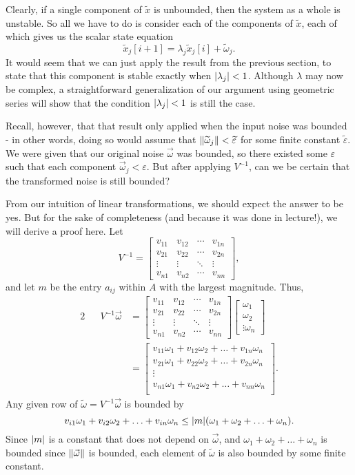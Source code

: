 \documentclass[letterpaper]{article}
\theoremstyle{remark}
\newcommand{\eps}{{\varepsilon}}    %
\renewcommand{\tilde}[1]{\widetilde{#1}}
\newcommand{\mat}[1]{\ensuremath{\begin{bmatrix}#1\end{bmatrix}}}
\newcommand{\eqn}[1]{\begin{alignat*}{2}#1\end{alignat*}}
\begin{document}
Clearly, if a single component of $\tilde{x}$ is unbounded, then the system as a whole is unstable. So all we have to do is consider each of the components of $\tilde{x}$, each of which gives us the scalar state equation
\[
    \tilde{x}_j[i + 1] = \lambda_j \tilde{x}_j[i] + \tilde{\omega}_j.
\]
It would seem that we can just apply the result from the previous section, to state that this component is stable exactly when $\abs{\lambda_j} < 1$. Although $\lambda$ may now be complex, a straightforward generalization of our argument using geometric series will show that the condition $\abs{\lambda_j} < 1$ is still the case.

Recall, however, that that result only applied when the input noise was bounded - in other words, doing so would assume that $\norm{\tilde{\omega}_j} < \tilde{\eps}$ for some finite constant $\tilde{\eps}$. We were given that our original noise $\vec{\omega}$ was bounded, so there existed some $\eps$ such that each component $\vec{\omega}_j < \eps$. But after applying $V^{-1}$, can we be certain that the transformed noise is still bounded? 

From our intuition of linear transformations, we should expect the answer to be yes. But for the sake of completeness (and because it was done in lecture!), we will derive a proof here. Let
\[
    V^{-1} = \mat{
    v_{11} & v_{12} & \cdots & v_{1n} \\
    v_{21} & v_{22} & \cdots & v_{2n} \\
    \vdots & \vdots & \ddots & \vdots \\
    v_{n1} & v_{n2} & \cdots & v_{nn}
    },
\]
and let $m$ be the entry $a_{ij}$ within $A$ with the largest magnitude. Thus,
\eqn{
    && V^{-1}\vec{\omega} &= \mat{
    v_{11} & v_{12} & \cdots & v_{1n} \\
    v_{21} & v_{22} & \cdots & v_{2n} \\
    \vdots & \vdots & \ddots & \vdots \\
    v_{n1} & v_{n2} & \cdots & v_{nn}
    } \mat{\omega_1 \\ \omega_2 \\ \vdots \omega_n} \\
    &&&= \mat{
    v_{11}\omega_1 + v_{12}\omega_2 + \ldots + v_{1n}\omega_n \\
    v_{21}\omega_1 + v_{22}\omega_2 + \ldots + v_{2n}\omega_n \\
    \vdots \\
    v_{n1}\omega_1 + v_{n2}\omega_2 + \ldots + v_{nn}\omega_n \\
    }.
}
Any given row of $\tilde{\omega} = V^{-1}\vec{\omega}$ is bounded by
\[
    v_{i1}\omega_1 + v_{i2}\omega_2 + \ldots + v_{in}\omega_n \le \abs{m}(\omega_1 + \omega_2 + \ldots + \omega_n).
\]
Since $\abs{m}$ is a constant that does not depend on $\vec{\omega}$, and $\omega_1 + \omega_2 + \ldots + \omega_n$ is bounded since $\norm{\vec{\omega}}$ is bounded, each element of $\tilde{\omega}$ is also bounded by some finite constant.
\end{document}
